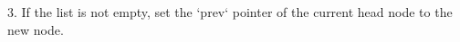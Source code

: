 \documentclass[preview]{standalone}
\begin{document}
3. If the list is not empty, set the `prev` pointer of the current head node to the new node.\\
\end{document}
